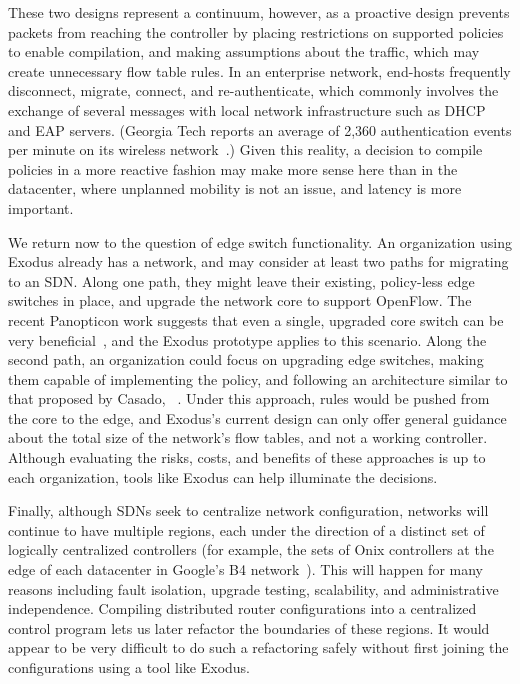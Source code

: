 These two designs represent a continuum, however, as a proactive
design prevents packets from reaching the controller by placing restrictions on supported
policies to enable compilation, and making assumptions about the traffic, which may create unnecessary flow table
rules.
In an enterprise network, end-hosts frequently disconnect, migrate, connect, and re-authenticate,
which commonly involves the exchange of several messages with local network infrastructure
such as DHCP and EAP servers.
(Georgia Tech reports an average of 2,360 authentication events per minute on its
wireless network~\cite{Kim:2013pyresonanceTR}.)
Given this reality, a decision to compile policies in a more
reactive fashion may make more sense here than in the datacenter, where unplanned mobility is
not an issue, and latency is more important.

We return now to the question of edge switch functionality. An organization using Exodus
already has a network, and may consider at least two paths for migrating to an SDN.
Along one path, they might leave their existing, policy-less edge switches in place, and
upgrade the network core to support OpenFlow. The recent Panopticon work suggests
that even a single, upgraded core switch can be very beneficial~\cite{levin13panopticonTR}, and the Exodus
prototype applies to this scenario. Along the second path, an organization could
focus on upgrading edge switches, making them capable of implementing the policy,
and following an architecture similar to that proposed by Casado, \etal~\cite{Casado:hotsdn2012-fabric}. Under
this approach, rules would be pushed from the core to the edge, and Exodus's current
design can only offer general guidance about the total size of the network's flow tables,
and not a working controller. Although evaluating the risks, costs, and benefits of these
approaches is up to each organization, tools like Exodus can help illuminate the decisions.

Finally, although SDNs seek to centralize network configuration, networks will continue
to have multiple regions, each under the direction of a distinct set of logically centralized
controllers (for example, the sets of Onix controllers at the edge of each datacenter in
Google's B4 network~\cite{jain++:sigcomm13-google-sdn}). This will happen for many reasons including fault
isolation, upgrade testing, scalability, and administrative independence.
Compiling distributed router configurations into a centralized control program lets us later
refactor the boundaries of these regions. It would appear to be very difficult to do such a refactoring safely
without first joining the configurations using a tool like Exodus.

